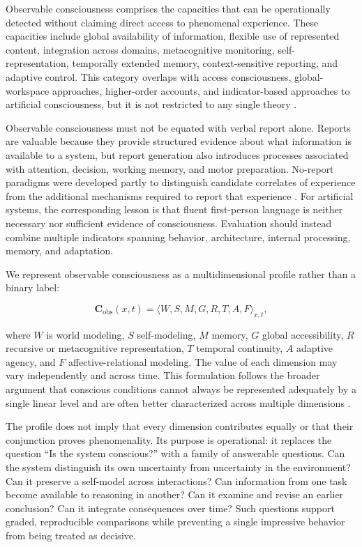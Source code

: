 Observable consciousness comprises the capacities that can be operationally detected without claiming direct access to phenomenal experience. These capacities include global availability of information, flexible use of represented content, integration across domains, metacognitive monitoring, self-representation, temporally extended memory, context-sensitive reporting, and adaptive control. This category overlaps with access consciousness, global-workspace approaches, higher-order accounts, and indicator-based approaches to artificial consciousness, but it is not restricted to any single theory \cite{block1995confusion,baars1988cognitive,dehaene2011experimental,mashour2020conscious,butlin2023consciousness}.

Observable consciousness must not be equated with verbal report alone. Reports are valuable because they provide structured evidence about what information is available to a system, but report generation also introduces processes associated with attention, decision, working memory, and motor preparation. No-report paradigms were developed partly to distinguish candidate correlates of experience from the additional mechanisms required to report that experience \cite{tsuchiya2015noreport}. For artificial systems, the corresponding lesson is that fluent first-person language is neither necessary nor sufficient evidence of consciousness. Evaluation should instead combine multiple indicators spanning behavior, architecture, internal processing, memory, and adaptation.

We represent observable consciousness as a multidimensional profile rather than a binary label:

\begin{equation}
\mathbf{C}_{\mathrm{obs}}(x,t)
=
\langle W,S,M,G,R,T,A,F\rangle_{x,t},
\label{eq:observable-profile}
\end{equation}

where $W$ is world modeling, $S$ self-modeling, $M$ memory, $G$ global accessibility, $R$ recursive or metacognitive representation, $T$ temporal continuity, $A$ adaptive agency, and $F$ affective-relational modeling. The value of each dimension may vary independently and across time. This formulation follows the broader argument that conscious conditions cannot always be represented adequately by a single linear level and are often better characterized across multiple dimensions \cite{bayne2016levels}.

The profile does not imply that every dimension contributes equally or that their conjunction proves phenomenality. Its purpose is operational: it replaces the question ``Is the system conscious?'' with a family of answerable questions. Can the system distinguish its own uncertainty from uncertainty in the environment? Can it preserve a self-model across interactions? Can information from one task become available to reasoning in another? Can it examine and revise an earlier conclusion? Can it integrate consequences over time? Such questions support graded, reproducible comparisons while preventing a single impressive behavior from being treated as decisive.


